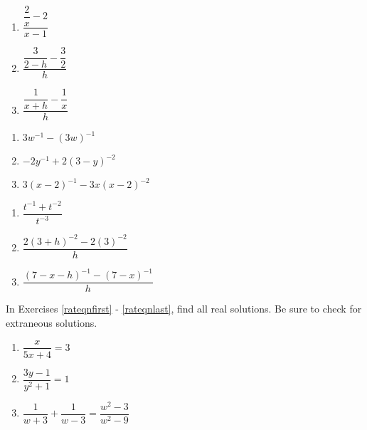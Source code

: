 \documentclass{ximera}
\begin{document}
\begin{multicols}{3}
\begin{enumerate}
\setcounter{enumi}{\value{HW}}

\item $\dfrac{\dfrac{2}{x} - 2}{x-1}$
\item $\dfrac{\dfrac{3}{2-h} - \dfrac{3}{2}}{h}$
\item $\dfrac{\dfrac{1}{x+h} - \dfrac{1}{x}}{h}$

\setcounter{HW}{\value{enumi}}
\end{enumerate}
\end{multicols}


\begin{multicols}{3}
\begin{enumerate}
\setcounter{enumi}{\value{HW}}

\item  $3w^{-1} - (3w)^{-1}$
\item  $-2y^{-1}  + 2(3-y)^{-2}$
\item  $3(x-2)^{-1} - 3x(x-2)^{-2}$

 
\setcounter{HW}{\value{enumi}}
\end{enumerate}
\end{multicols}

\begin{multicols}{3}
\begin{enumerate}
\setcounter{enumi}{\value{HW}}

\item $\dfrac{t^{-1} + t^{-2}}{t^{-3}}$  
\item $\dfrac{2(3+h)^{-2} - 2(3)^{-2}}{h}$ 
\item $\dfrac{(7-x-h)^{-1} - (7-x)^{-1}}{h}$  \label{ratsimplast}


\setcounter{HW}{\value{enumi}}
\end{enumerate}
\end{multicols}

\vspace{-0.15in}

In Exercises \ref{rateqnfirst} - \ref{rateqnlast}, find all real solutions.  Be sure to check for extraneous solutions.

\begin{multicols}{3}
\begin{enumerate}
\setcounter{enumi}{\value{HW}}

\item $\dfrac{x}{5x + 4} = 3$ \label{rateqnfirst}
\item $\dfrac{3y - 1}{y^{2} + 1} = 1$
\item $\dfrac{1}{w + 3} + \dfrac{1}{w - 3} = \dfrac{w^{2} - 3}{w^{2} - 9}$

\setcounter{HW}{\value{enumi}}
\end{enumerate}
\end{multicols}
\end{document}
